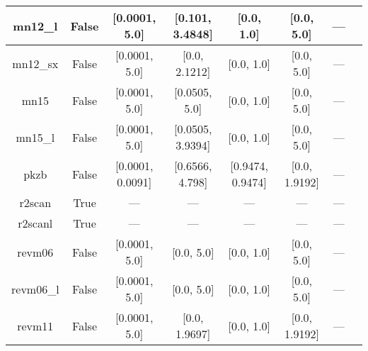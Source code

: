 \begin{tabular}{|c|c|c|c|c|c|c|l|}
      mn12\_l &                 False &    [0.0001, 5.0] &  [0.101, 3.4848] &       [0.0, 1.0] &     [0.0, 5.0] &        --- &                                                          \cite{Peverati2012_13171} \\ \hline
     mn12\_sx &                 False &    [0.0001, 5.0] &    [0.0, 2.1212] &       [0.0, 1.0] &     [0.0, 5.0] &        --- &                                                          \cite{Peverati2012_16187} \\ \hline
         mn15 &                 False &    [0.0001, 5.0] &    [0.0505, 5.0] &       [0.0, 1.0] &     [0.0, 5.0] &        --- &                                                                 \cite{Yu2016_5032} \\ \hline
      mn15\_l &                 False &    [0.0001, 5.0] & [0.0505, 3.9394] &       [0.0, 1.0] &     [0.0, 5.0] &        --- &                                                                 \cite{Yu2016_1280} \\ \hline
         pkzb &                 False & [0.0001, 0.0091] &  [0.6566, 4.798] & [0.9474, 0.9474] &  [0.0, 1.9192] &        --- &                                                             \cite{Perdew1999_2544} \\ \hline
       r2scan &                  True &              --- &              --- &              --- &            --- &        --- &                                           \cite{Furness2020_8208,Furness2020_9248} \\ \hline
      r2scanl &                  True &              --- &              --- &              --- &            --- &        --- &                          \cite{Mejia2020_121109,Furness2020_8208,Furness2020_9248} \\ \hline
       revm06 &                 False &    [0.0001, 5.0] &       [0.0, 5.0] &       [0.0, 1.0] &     [0.0, 5.0] &        --- &                                                              \cite{Wang2018_10257} \\ \hline
    revm06\_l &                 False &    [0.0001, 5.0] &       [0.0, 5.0] &       [0.0, 1.0] &     [0.0, 5.0] &        --- &                                                               \cite{Wang2017_8487} \\ \hline
       revm11 &                 False &    [0.0001, 5.0] &    [0.0, 1.9697] &       [0.0, 1.0] &  [0.0, 1.9192] &        --- &                                                              \cite{Verma2019_2966} \\ \hline

\end{tabular}

